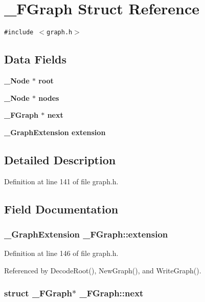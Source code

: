 \section{\_\-FGraph Struct Reference}
\label{struct__FGraph}
{\tt \#include $<$graph.h$>$}

\subsection*{Data Fields}
\begin{CompactItemize}
\item 
\bf{\_\-Node} $\ast$ \bf{root}
\item 
\bf{\_\-Node} $\ast$ \bf{nodes}
\item 
\bf{\_\-FGraph} $\ast$ \bf{next}
\item 
\bf{\_\-Graph\-Extension} \bf{extension}
\end{CompactItemize}


\subsection{Detailed Description}




Definition at line 141 of file graph.h.

\subsection{Field Documentation}
\subsubsection{\setlength{\rightskip}{0pt plus 5cm}\bf{\_\-Graph\-Extension} \bf{\_\-FGraph::extension}}\label{struct__FGraph_ff10a12479cc7d1b0b0bd81ab7e90d5b}




Definition at line 146 of file graph.h.

Referenced by Decode\-Root(), New\-Graph(), and Write\-Graph().
\subsubsection{\setlength{\rightskip}{0pt plus 5cm}struct \bf{\_\-FGraph}$\ast$ \bf{\_\-FGraph::next}}\label{struct__FGraph_c91ad27a6a3b436c29ff93e63d6c0a38}




